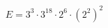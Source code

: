 \documentclass[preview]{standalone}
\begin{document}
\begin{align*}
E = 3^3 \cdot 3^{18} \cdot 2^6 \cdot (2^2)^2
\end{align*}
\end{document}
